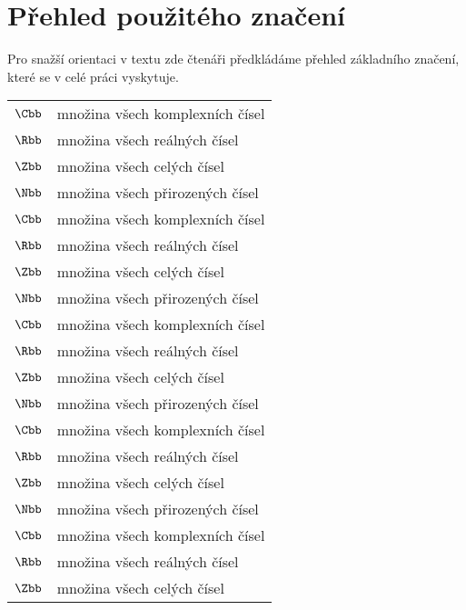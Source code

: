 \chapter*{Přehled použitého značení}

Pro snažší orientaci v textu zde čtenáři předkládáme přehled základního značení, které se v celé práci vyskytuje.
\begin{flushleft}
\begin{longtable}[l]{ll} %
  $\Cbb$                 & množina všech komplexních čísel \\[1mm]
  $\Rbb$                 & množina všech reálných čísel \\[1mm]
  $\Zbb$                 & množina všech celých čísel \\[1mm]
  $\Nbb$                 & množina všech přirozených čísel\\[1mm]
  $\Cbb$                 & množina všech komplexních čísel \\[1mm]
  $\Rbb$                 & množina všech reálných čísel \\[1mm]
  $\Zbb$                 & množina všech celých čísel \\[1mm]
  $\Nbb$                 & množina všech přirozených čísel\\[1mm]
  $\Cbb$                 & množina všech komplexních čísel \\[1mm]
  $\Rbb$                 & množina všech reálných čísel \\[1mm]
  $\Zbb$                 & množina všech celých čísel \\[1mm]
  $\Nbb$                 & množina všech přirozených čísel\\[1mm]
  $\Cbb$                 & množina všech komplexních čísel \\[1mm]
  $\Rbb$                 & množina všech reálných čísel \\[1mm]
  $\Zbb$                 & množina všech celých čísel \\[1mm]
  $\Nbb$                 & množina všech přirozených čísel\\[1mm]
  $\Cbb$                 & množina všech komplexních čísel \\[1mm]
  $\Rbb$                 & množina všech reálných čísel \\[1mm]
  $\Zbb$                 & množina všech celých čísel \\[1mm]

\end{longtable}
\end{flushleft}

